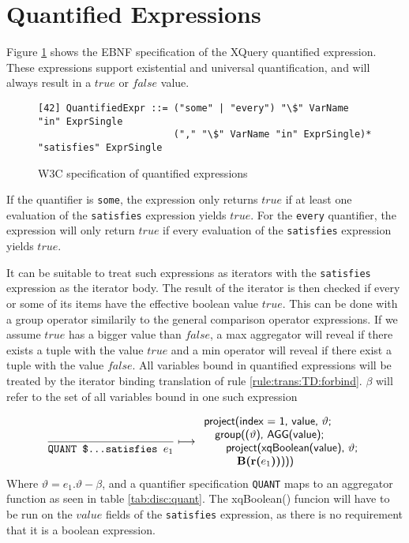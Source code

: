 \section{Quantified Expressions}
\label{sect:disc:not:quantified}

Figure \ref{fig:disc:not:quantified} shows the EBNF specification of the XQuery quantified expression. These
expressions support existential and universal quantification, and will always result in a $true$ or $false$ value.

\begin{figure}[h]
\begin{Verbatim}
[42] QuantifiedExpr ::= ("some" | "every") "\$" VarName "in" ExprSingle 
                        ("," "\$" VarName "in" ExprSingle)* "satisfies" ExprSingle
\end{Verbatim}
\caption{W3C specification of quantified expressions \cite{w3c00} \label{fig:disc:not:quantified}}
\end{figure}

If the quantifier is \texttt{some}, the expression only returns $true$ if at least one evaluation of the
\texttt{satisfies} expression yields $true$. For the \texttt{every} quantifier, the expression will only return
$true$ if every evaluation of the \texttt{satisfies} expression yields $true$.

It can be suitable to treat such expressions as iterators with the \texttt{satisfies} expression as the iterator
body. The result of the iterator is then checked if every or some of its items have the effective boolean value
$true$. This can be done with a \textsf{group} operator similarily to the
general comparison operator expressions. If we assume $true$ has a bigger value
than $false$, a \textsf{max} aggregator will reveal if there exists a tuple with the value $true$ and a \textsf{min} operator will reveal if there exist a tuple with the value $false$. All
variables bound in quantified expressions will be treated by the iterator binding translation of rule
\ref{rule:trans:TD:forbind}. $\beta$ will refer to the set of all variables bound in one such expression

\begin{equation}
\frac{}{\mbox{\texttt{QUANT \$\ldots  satisfies }}e_1} \longmapsto
\begin{array}{l}
\mbox{\textsf{project(index = 1, value, }}\vartheta\mbox{\textsf{;}} \\ \quad
\mbox{\textsf{group((}}\vartheta\mbox{\textsf{), AGG(value);}} \\ \quad\quad
\mbox{\textsf{project(xqBoolean(value), }}\vartheta\mbox{\textsf{;}} \\ \quad\quad\quad
\mbox{\textbf{B(r(}}e_1\mbox{\textbf{))}\textsf{)))}}
\end{array}
\label{rule:trans:TD:quantified}
\end{equation}
Where $\vartheta=e_1.\vartheta-\beta$, and a quantifier specification \texttt{QUANT} maps to an aggregator
function as seen in table \ref{tab:disc:quant}. The \textsf{xqBoolean()} funcion will have to be run on the
$value$ fields of the \texttt{satisfies} expression, as there is no requirement that it is a boolean expression.

